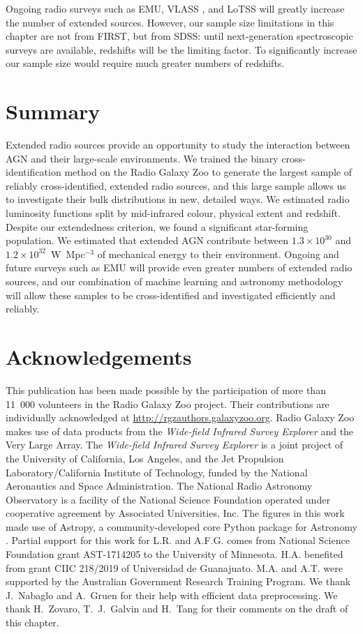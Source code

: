     Ongoing radio surveys such as EMU, VLASS \citep{lacy20vlass}, and LoTSS \linebreak \citep{shimwell19lotss} will greatly increase the number of extended sources. However, our sample size limitations in this chapter are not from FIRST, but from SDSS: until next-generation spectroscopic surveys are available, redshifts will be the limiting factor. To significantly increase our sample size would require much greater numbers of redshifts.

\section{Summary}\label{sec:rlfs-summary}

  Extended radio sources provide an opportunity to study the interaction between AGN and their large-scale environments. We trained the binary cross-identification method on the Radio Galaxy Zoo to generate the largest sample of reliably cross-identified, extended radio sources, and this large sample allows us to investigate their bulk distributions in new, detailed ways. We estimated radio luminosity functions split by mid-infrared colour, physical extent and redshift. Despite our extendedness criterion, we found a significant star-forming population. We estimated that extended AGN contribute between $1.3 \times 10^{30}$ and $1.2 \times 10^{32}$~W~Mpc$^{-3}$ of mechanical energy to their environment. Ongoing and future surveys such as EMU will provide even greater numbers of extended radio sources, and our combination of machine learning and astronomy methodology will allow these samples to be cross-identified and investigated efficiently and reliably.

\section{Acknowledgements}

This publication has been made possible by the participation of more than
11~000 volunteers in the Radio Galaxy Zoo project. Their contributions are
individually acknowledged at \url{http://rgzauthors.galaxyzoo.org}. Radio
Galaxy Zoo makes use of data products from the \emph{Wide-field Infrared Survey
Explorer} and the Very Large Array. The \emph{Wide-field Infrared Survey Explorer}
is a joint project of the University of California, Los Angeles, and the Jet
Propulsion Laboratory/California Institute of Technology, funded by the
National Aeronautics and Space Administration. The National Radio Astronomy
Observatory is a facility of the National Science Foundation operated under
cooperative agreement by Associated Universities, Inc. The figures in this
work made use of Astropy, a community-developed core Python package for
Astronomy \citep{astropy}. Partial support for this work for L.R. and A.F.G. comes from National Science Foundation grant AST-1714205 to the University of Minnesota. H.A. benefited from grant CIIC 218/2019 of Universidad de Guanajuato. M.A. and A.T. were supported by the Australian Government Research Training Program. We thank J.~Nabaglo and A.~Gruen for their help with efficient data preprocessing. We thank H.~Zovaro, T.~J.~Galvin and H.~Tang for their comments on the draft of this chapter.

